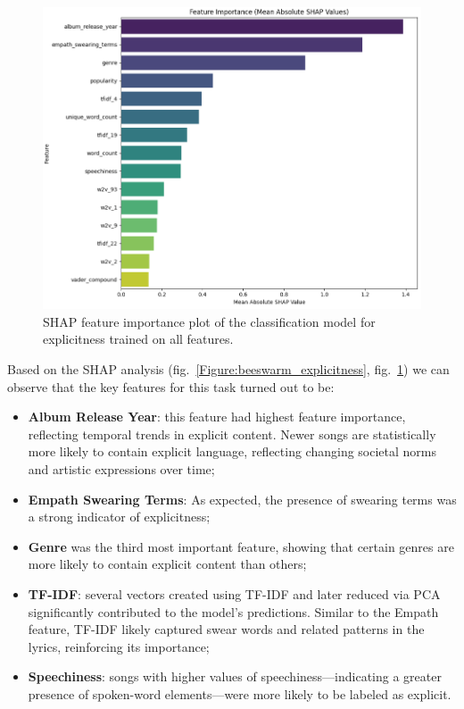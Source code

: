 \begin{center}
\begin{figure}[H]
  \centering
  \includegraphics[width=6in]{img/feature_importance_explicitness.png}
  \caption{SHAP feature importance plot of the classification model for
  explicitness  trained on all features.}
  \label{Figure:feature_importance_explicitness}
\end{figure}
\end{center}


Based on the SHAP analysis (fig.~\ref{Figure:beeswarm_explicitness},
fig.~\ref{Figure:feature_importance_explicitness}) we can observe that the key
features for this task turned out to be:
\begin{itemize}
  \item \textbf{Album Release Year}: this feature had  highest feature
    importance, reflecting temporal trends in explicit content. Newer songs are
    statistically more likely to contain explicit language, reflecting changing
    societal norms and artistic expressions over time;
  \item \textbf{Empath Swearing Terms}: As expected, the presence of swearing
    terms was a strong indicator of explicitness;
  \item \textbf{Genre} was the third most important feature, showing that
    certain genres  are more likely to contain explicit content than others;
  \item \textbf{TF-IDF}: several vectors created using TF-IDF and later reduced
    via PCA significantly contributed to the model's predictions. Similar to
    the Empath feature, TF-IDF likely captured swear words and related patterns
    in the lyrics, reinforcing its importance;
  \item \textbf{Speechiness}: songs with higher values of
    speechiness—indicating a greater presence of spoken-word elements—were more
    likely to be labeled as explicit.
\end{itemize}




